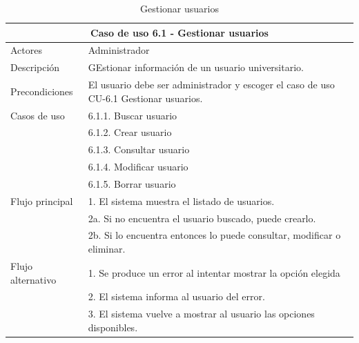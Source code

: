 \begin{table}[H]
    \caption{Gestionar usuarios}
    \label{tab:CU-6.1}
    \begin{center}
        \begin{tabular}{|l|p{12cm}|}
            \hline
            \multicolumn{2}{|c|}{Caso de uso 6.1 - Gestionar usuarios} \\ \hline \hline

            Actores                 &   Administrador\\  \hline
            Descripción             &   GEstionar información de un usuario universitario. \\  \hline
            Precondiciones          &   El usuario debe ser administrador  y escoger el caso de uso CU-6.1 Gestionar usuarios.        \\  \hline
            Casos de uso            & 6.1.1. Buscar usuario  \\ 
            & 6.1.2. Crear usuario \\ 
            & 6.1.3. Consultar usuario \\ 
            & 6.1.4. Modificar usuario \\ 
            & 6.1.5. Borrar usuario \\    
            \hline
            Flujo principal         &   1. El sistema muestra el listado de usuarios.   \\ 
            & 2a. Si no encuentra el usuario buscado, puede crearlo. \\ 
            & 2b. Si lo encuentra entonces lo puede consultar, modificar o eliminar.  \\ 
            \hline
            Flujo alternativo    &   1. Se produce un error al intentar mostrar la opción  elegida  \\ 
            & 2. El sistema informa al usuario del error. \\ 
            & 3. El sistema vuelve a mostrar al usuario las opciones disponibles.   \\  \hline
            
        \end{tabular}
    \end{center}
\end{table}

